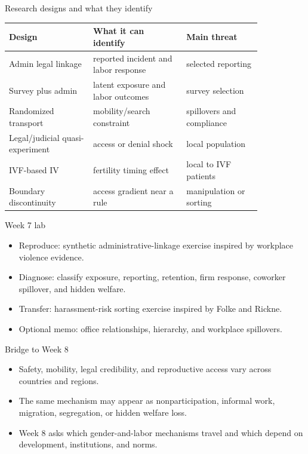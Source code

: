 \documentclass[aspectratio=169,11pt]{beamer}
\begin{document}
\begin{frame}{Research designs and what they identify}
\scriptsize
\begin{tabular}{p{0.28\linewidth} p{0.31\linewidth} p{0.25\linewidth}}
\toprule
Design & What it can identify & Main threat \\
\midrule
Admin legal linkage & reported incident and labor response & selected reporting \\
Survey plus admin & latent exposure and labor outcomes & survey selection \\
Randomized transport & mobility/search constraint & spillovers and compliance \\
Legal/judicial quasi-experiment & access or denial shock & local population \\
IVF-based IV & fertility timing effect & local to IVF patients \\
Boundary discontinuity & access gradient near a rule & manipulation or sorting \\
\bottomrule
\end{tabular}
\end{frame}

\begin{frame}{Week 7 lab}
\begin{itemize}
    \item Reproduce: synthetic administrative-linkage exercise inspired by workplace violence evidence.
    \item Diagnose: classify exposure, reporting, retention, firm response, coworker spillover, and hidden welfare.
    \item Transfer: harassment-risk sorting exercise inspired by Folke and Rickne.
    \item Optional memo: office relationships, hierarchy, and workplace spillovers.
\end{itemize}
\end{frame}

\begin{frame}{Bridge to Week 8}
\begin{itemize}
    \item Safety, mobility, legal credibility, and reproductive access vary across countries and regions.
    \item The same mechanism may appear as nonparticipation, informal work, migration, segregation, or hidden welfare loss.
    \item Week 8 asks which gender-and-labor mechanisms travel and which depend on development, institutions, and norms.
\end{itemize}
\end{frame}
\end{document}
